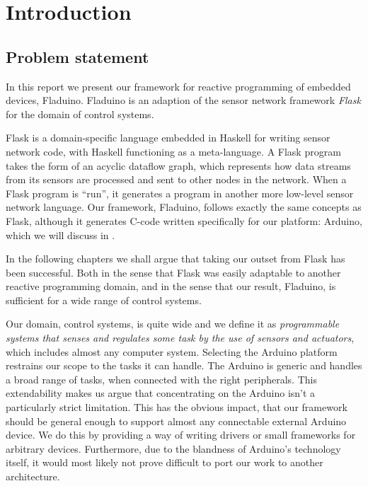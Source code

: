 \documentclass[a4paper, oneside, final]{memoir}
\let\fref\undefined
\begin{document}





\mainmatter

\chapter{Introduction}

\section{Problem statement}
In this report we present our framework for reactive programming of
embedded devices, Fladuino. Fladuino is an adaption of the
sensor network framework \textit{Flask} for the domain of control
systems.

Flask is a domain-specific language embedded in Haskell for writing
sensor network code, with Haskell functioning as a meta-language. A
Flask program takes the form of an acyclic dataflow graph, which
represents how data streams from its sensors are processed and sent to
other nodes in the network. When a Flask program is ``run'', it
generates a program in another more low-level sensor network
language. Our framework, Fladuino, follows exactly the same concepts
as Flask, although it generates C-code written specifically for our
platform: Arduino, which we will discuss in \fref{sec:hardware platform}.

In the following chapters we shall argue that taking our outset from
Flask has been successful. Both in the sense that Flask was easily
adaptable to another reactive programming domain, and in the sense
that our result, Fladuino, is sufficient for a wide range of control
systems.

Our domain, control systems, is quite wide and we define it as
\textit{programmable systems that senses and regulates some task by the use of
  sensors and actuators}, which includes almost any computer system.  Selecting
the Arduino platform restrains our scope to the tasks it can handle. The Arduino
is generic and handles a broad range of tasks, when connected with the right
peripherals. This extendability makes us argue that concentrating on the Arduino
isn't a particularly strict limitation. This has the obvious impact, that our
framework should be general enough to support almost any connectable
external Arduino device. We do this by providing a way of writing drivers or small
frameworks for arbitrary devices.  Furthermore, due to the blandness of
Arduino's technology itself, it would most likely not prove difficult to port
our work to another architecture.
\end{document}
